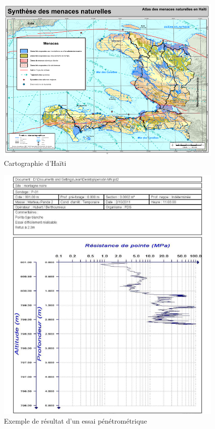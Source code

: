 \begin{figure}
    \centering
    \includegraphics[width=1\textwidth]{images/Contexte/map-haiti.png}
    \caption{Cartographie d'Haïti}
    \label{fig:map-haiti}
\end{figure}

\begin{figure}
    \centering
    \includegraphics[width=1\textwidth]{images/Contexte/penetrographe.png}
    \caption{Exemple de résultat d'un essai pénétrométrique}
    \label{fig:test_penetrometrique}
\end{figure}
